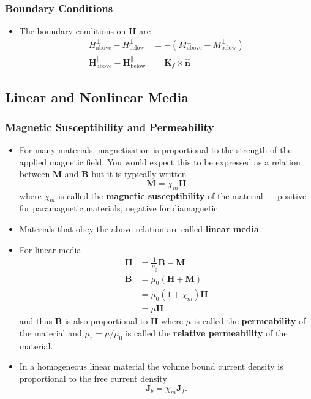 \documentclass{article}
\renewcommand{\vec}[1]{\boldsymbol{\mathbf{#1}}}
\newcommand{\uvec}[1]{\hat{\vec{#1}}}
\begin{document}
\setcounter{subsubsection}{2}
\subsubsection{Boundary Conditions}

\begin{itemize}
  \item The boundary conditions on $\vec{H}$ are \begin{align*}
          H_\text{above}^\perp - H_\text{below}^\perp                     & = -(M_\text{above}^\perp - M_\text{below}^\perp) \\
          \vec{H}_\text{above}^\parallel - \vec{H}_\text{below}^\parallel & = \vec{K}_f \times \uvec{n}
        \end{align*}
\end{itemize}

\subsection{Linear and Nonlinear Media}

\subsubsection{Magnetic Susceptibility and Permeability}

\begin{itemize}
  \item For many materials, magnetisation is proportional to the strength of the applied magnetic field. You would expect this to be expressed as a relation between $\vec{M}$ and $\vec{B}$ but it is typically written \[\vec{M} = \chi_m \vec{H}\] where $\chi_m$ is called the \textbf{magnetic susceptibility} of the material — positive for paramagnetic materials, negative for diamagnetic.

  \item Materials that obey the above relation are called \textbf{linear media}.

  \item For linear media \begin{align*}
          \vec{H} & = \frac{1}{\mu_0} \vec{B} - \vec{M} \\
          \vec{B} & = \mu_0 (\vec{H} + \vec{M})         \\
                  & = \mu_0 (1 + \chi_m) \vec{H}        \\
                  & = \mu \vec{H}
        \end{align*} and thus $\vec{B}$ is also proportional to $\vec{H}$ where $\mu$ is called the \textbf{permeability} of the material and $\mu_r = \mu / \mu_0$ is called the \textbf{relative permeability} of the material.

  \item In a homogeneous linear material the volume bound current density is proportional to the free current density \[\vec{J}_b = \chi_m \vec{J}_f.\]
\end{itemize}
\end{document}
